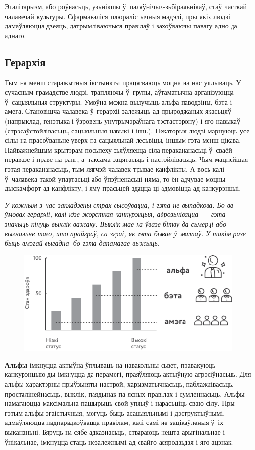Эгалітарызм, або роўнасьць, узьнікшы ў~паляўнічых-зьбіральнікаў, стаў часткай чалавечай культуры. Сфармаваліся плюралістычныя мадэлі, пры якіх людзі дамаўляюцца дзеяць, датрымліваючыся правілаў і захоўваючы павагу адно да аднаго.

\subsection*{Герархія}

Тым ня менш старажытныя інстынкты працягваюць моцна на нас уплываць. У сучасным грамадстве людзі, трапляючы ў~групы, аўтаматычна арганізуюцца ў~сацыяльныя структуры. Умоўна можна вылучыць альфа-паводзіны, бэта і амега. Становішча чалавека ў~герархіі залежыць ад прыроджаных якасьцяў (напрыклад, генэтыка і ўзровень унутрычэраўнага тэстастэрону) і яго навыкаў (стрэсаўстойлівасьць, сацыяльныя навыкі і інш.). Некаторыя людзі марнуюць усе сілы на прасоўваньне уверх па сацыяльнай лесьвіцы, іншым гэта менш цікава. Найважнейшым крытэрам посьпеху зьяўляецца сіла перакананасьці ў~сваёй перавазе і праве на ранг, а~таксама зацятасьць і настойлівасьць. Чым мацнейшая гэтая перакананасьць, тым лягчэй чалавек трывае канфлікты. А вось калі ў~чалавека такой упартасьці або ўпэўненасьці няма, то ён адчувае моцны дыскамфорт ад канфлікту, і яму прасьцей здацца ці адмовіцца ад канкурэнцыі.

\emph{У кожным з~нас закладзены страх высоўвацца, і гэта не выпадкова. Бо ва ўмовах герархіі, калі ідзе жорсткая канкурэнцыя, адрозьнівацца~--- гэта значыць кінуць выклік важаку. Выклік мае на ўвазе бітву да сьмерці або выгнаньне таго, хто прайграў, са зграі, як гэта бывае ў~малпаў. У такім разе быць амэгай выгадна, бо гэта дапамагае выжыць.}

\begin{figure}[htb!]
  \centering
  \includegraphics[scale=1.5]{willpower/ch9/2.pdf}
\end{figure}

\textbf{Альфы} імкнуцца актыўна ўплываць на навакольны сьвет, правакуюць канкурэнцыю ды імкнуцца да перамогі, праяўляюць актыўную агрэсіўнасьць. Для альфы характэрны прыўзьняты настрой, харызматычнасьць, паблажлівасьць, просталінейнасьць, выклік, паядынак па ясных правілах і сумленнасьць. Альфы намагаюцца максімальна пашырыць свой уплыў і нарасьціць сваю сілу. Пры гэтым альфы эгаістычныя, могуць быць асацыяльнымі і дэструктыўнымі, адмаўляюцца падпарадкоўвацца правілам, калі самі не зацікаўленыя ў~іх выкананьні. Бяруць на сябе адказнасьць, ствараюць нешта арыгінальнае і ўнікальнае, імкнуцца стаць незалежнымі ад свайго асяродзьдзя і яго ацэнак.

